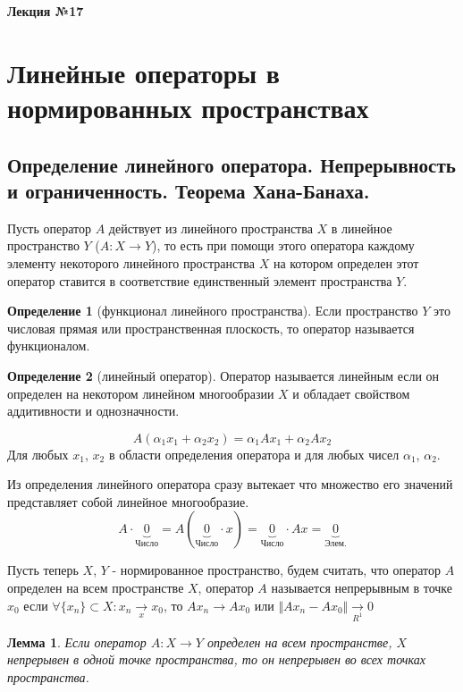 \documentclass[14pt,a4paper]{extarticle}
\newtheorem{lemma}{Лемма}[section]
\theoremstyle{definition}
\newtheorem{definition}{Определение}[section]
\theoremstyle{remark}
\renewcommand{\[}{\begin{dmath*}[compact]}
\renewcommand{\]}{\end{dmath*}}
\begin{document}
\textbf{Лекция №17}

\section{Линейные операторы в нормированных пространствах}

\subsection{Определение линейного оператора. Непрерывность и ограниченность.
Теорема Хана-Банаха.}

Пусть оператор $A$ действует из линейного пространства $X$ в
линейное пространство $Y$ ($A: X \to Y$), то есть при помощи этого оператора
каждому элементу некоторого линейного пространства $X$ на котором определен
этот оператор ставится в соответствие единственный элемент пространства $Y$.

\begin{definition}[функционал линейного пространства]
  Если пространство $Y$ это числовая прямая или пространственная плоскость,
  то оператор называется функционалом.
\end{definition}

\begin{definition}[линейный оператор]
  Оператор называется линейным если он определен на некотором
  линейном многообразии $X$ и обладает свойством аддитивности и однозначности.
\end{definition}

\[A(\alpha_1x_1 + \alpha_2x_2) = \alpha_1Ax_1 + \alpha_2Ax_2\]
Для любых $x_1$, $x_2$ в области определения оператора и для любых чисел
$\alpha_1$, $\alpha_2$.

Из определения линейного оператора сразу вытекает что множество его значений
представляет собой линейное многообразие.
\[A \cdot \underbrace{0}_{\text{Число}} =
A (\underbrace{0}_{\text{Число}} \cdot x) =
\underbrace{0}_{\text{Число}} \cdot Ax = \underbrace{0}_{\text{Элем.}}\]

Пусть теперь $X$, $Y$ - нормированное пространство, будем считать, что оператор
$A$ определен на всем пространстве $X$, оператор $A$ называется непрерывным
в точке $x_0$ если
$ \forall \{x_n\} \subset X: x_n \underset{x}{\to} x_0 $,
то $Ax_n \to Ax_0$ или  $\Vert Ax_n - A x_0 \Vert \underset{R^1}{\to}0$

\begin{lemma}
  Если оператор $A: X \to Y$ определен на всем пространстве,
  $X$ непрерывен в одной точке пространства,
  то он непрерывен во всех точках пространства.
\end{lemma}
\end{document}
